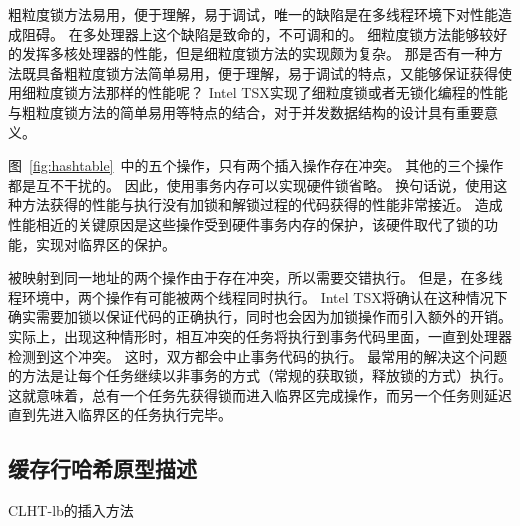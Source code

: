 粗粒度锁方法易用，便于理解，易于调试，唯一的缺陷是在多线程环境下对性能造成阻碍。
在多处理器上这个缺陷是致命的，不可调和的。
细粒度锁方法能够较好的发挥多核处理器的性能，但是细粒度锁方法的实现颇为复杂。
那是否有一种方法既具备粗粒度锁方法简单易用，便于理解，易于调试的特点，又能够保证获得使用细粒度锁方法那样的性能呢？
Intel TSX实现了细粒度锁或者无锁化编程的性能与粗粒度锁方法的简单易用等特点的结合，对于并发数据结构的设计具有重要意义。

图~\ref{fig:hashtable}~中的五个操作，只有两个插入操作存在冲突。
其他的三个操作都是互不干扰的。
因此，使用事务内存可以实现硬件锁省略。
换句话说，使用这种方法获得的性能与执行没有加锁和解锁过程的代码获得的性能非常接近。
造成性能相近的关键原因是这些操作受到硬件事务内存的保护，该硬件取代了锁的功能，实现对临界区的保护。

被映射到同一地址的两个操作由于存在冲突，所以需要交错执行。
但是，在多线程环境中，两个操作有可能被两个线程同时执行。
Intel TSX将确认在这种情况下确实需要加锁以保证代码的正确执行，同时也会因为加锁操作而引入额外的开销。
实际上，出现这种情形时，相互冲突的任务将执行到事务代码里面，一直到处理器检测到这个冲突。
这时，双方都会中止事务代码的执行。
最常用的解决这个问题的方法是让每个任务继续以非事务的方式（常规的获取锁，释放锁的方式）执行。
这就意味着，总有一个任务先获得锁而进入临界区完成操作，而另一个任务则延迟直到先进入临界区的任务执行完毕。

\subsection{缓存行哈希原型描述}

\begin{algorithm}[htbp]
\SetAlgoLined
{}%
%
\caption{CLHT-lb的插入方法}
\label{algo:clht-lb-insert}
\end{algorithm}

